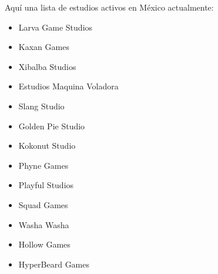 Aquí una lista de estudios activos en México actualmente:
\begin{itemize}
	\item Larva Game Studios
	\item Kaxan Games
	\item Xibalba Studios
	\item Estudios Maquina Voladora
	\item Slang Studio
	\item Golden Pie Studio
	\item Kokonut Studio
	\item Phyne Games
	\item Playful Studios
	\item Squad Games
	\item Washa Washa
	\item Hollow Games
	\item HyperBeard Games
	
\end{itemize}
